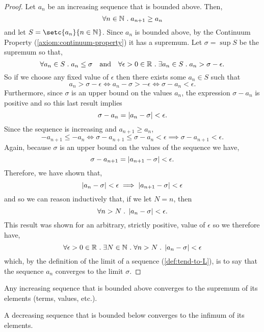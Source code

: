 \documentclass[../MathsNotesBase.tex]{subfiles}
\begin{document}
{		
		\bigskip
		\begin{proof}
			Let $a_n$ be an increasing sequence that is bounded above. Then,
			\[ \forall n \in \mathbb{N}^{} \;.\; a_{n+1} \geq a_n \]
			and let ${ S = \setc{a_n}{n \in \N{}} }$. Since $a_n$ is bounded above, by the Continuum Property (\autoref{axiom:continuum-property}) it has a supremum. Let $ \sigma = \sup S $ be the supremum so that,
			\[ \forall a_n \in S \;.\; a_n \leq \sigma \hspace{10pt}\text{and}\hspace{10pt} \forall \epsilon > 0 \in \mathbb{R}^{} \;.\; \exists a_n \in S \;.\; a_n > \sigma - \epsilon. \]
			So if we choose any fixed value of $\epsilon$ then there exists some ${ a_n \in S }$ such that
			\[ a_n > \sigma - \epsilon \iff a_n - \sigma > -\epsilon \iff \sigma - a_n < \epsilon. \]
			Furthermore, since $\sigma$ is an upper bound on the values $a_n$, the expression ${ \sigma - a_n }$ is positive and so this last result implies
			\[ \sigma - a_n = \left\lvert a_n - \sigma\right\rvert < \epsilon. \]
			Since the sequence is increasing and ${ a_{n+1} \geq a_n }$,
			\[ -a_{n+1} \leq -a_n \iff \sigma - a_{n+1} \leq \sigma - a_n < \epsilon \implies \sigma - a_{n+1} < \epsilon. \]
			Again, because $\sigma$ is an upper bound on the values of the sequence we have,
			\[  \sigma - a_{n+1} = \left\lvert a_{n+1} - \sigma\right\rvert < \epsilon. \]
			Therefore, we have shown that,
			\[ \left\lvert a_n - \sigma\right\rvert < \epsilon \implies \left\lvert a_{n+1} - \sigma\right\rvert < \epsilon \]
			and so we can reason inductively that, if we let ${ N = n }$, then
			\[ \forall n > N \;.\; \left\lvert a_n - \sigma\right\rvert < \epsilon. \]
			This result was shown for an arbitrary, strictly positive, value of $\epsilon$ so we therefore have,
			\[ \forall \epsilon > 0 \in \mathbb{R}^{} \;.\; \exists N \in \mathbb{N}^{} \;.\; \forall n > N \;.\; \left\lvert a_n - \sigma\right\rvert < \epsilon \]
			which, by the definition of the limit of a sequence (\ref{def:tend-to-L}), is to say that the sequence $a_n$ converges to the limit $\sigma$.
		\end{proof}
		
		\medskip
		\begin{corollary}\label{coro:increasing-seq-bounded-above-converges-to-supremum}
			Any increasing sequence that is bounded above converges to the supremum of its elements (terms, values, etc.).
		\end{corollary}
		\begin{corollary}\label{coro:decreasing-seq-bounded-below-converges-to-infimum}
			A decreasing sequence that is bounded below converges to the infimum of its elements.
		\end{corollary}
	
}
\end{document}
